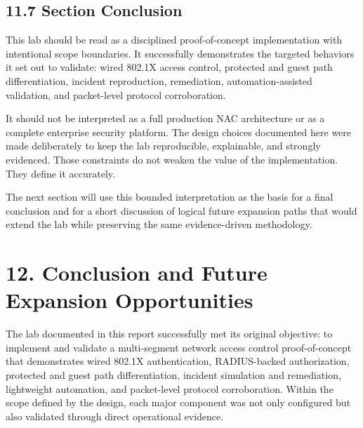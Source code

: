 \documentclass[11pt]{article}
\begin{document}
\subsection{11.7 Section Conclusion}
\label{sec:section-11-conclusion}

This lab should be read as a disciplined proof-of-concept implementation with intentional scope boundaries. It successfully demonstrates the targeted behaviors it set out to validate: wired 802.1X access control, protected and guest path differentiation, incident reproduction, remediation, automation-assisted validation, and packet-level protocol corroboration.

It should not be interpreted as a full production NAC architecture or as a complete enterprise security platform. The design choices documented here were made deliberately to keep the lab reproducible, explainable, and strongly evidenced. Those constraints do not weaken the value of the implementation. They define it accurately.

The next section will use this bounded interpretation as the basis for a final conclusion and for a short discussion of logical future expansion paths that would extend the lab while preserving the same evidence-driven methodology.


\section{12. Conclusion and Future Expansion Opportunities}
\label{sec:conclusion-and-future-expansion-opportunities}

The lab documented in this report successfully met its original objective: to implement and validate a multi-segment network access control proof-of-concept that demonstrates wired 802.1X authentication, RADIUS-backed authorization, protected and guest path differentiation, incident simulation and remediation, lightweight automation, and packet-level protocol corroboration. Within the scope defined by the design, each major component was not only configured but also validated through direct operational evidence.
\end{document}
